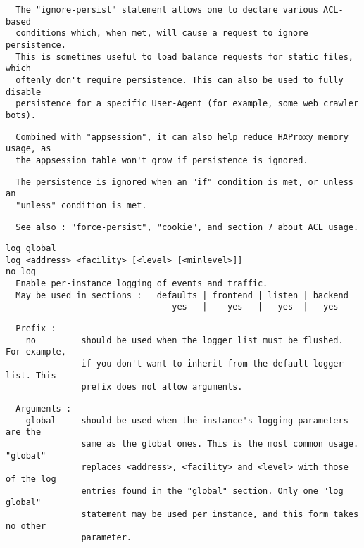 \begin{verbatim}
  The "ignore-persist" statement allows one to declare various ACL-based
  conditions which, when met, will cause a request to ignore persistence.
  This is sometimes useful to load balance requests for static files, which
  oftenly don't require persistence. This can also be used to fully disable
  persistence for a specific User-Agent (for example, some web crawler bots).
\end{verbatim}

\begin{verbatim}
  Combined with "appsession", it can also help reduce HAProxy memory usage, as
  the appsession table won't grow if persistence is ignored.
\end{verbatim}

\begin{verbatim}
  The persistence is ignored when an "if" condition is met, or unless an
  "unless" condition is met.
\end{verbatim}

\begin{verbatim}
  See also : "force-persist", "cookie", and section 7 about ACL usage.
\end{verbatim}

\begin{verbatim}
log global
log <address> <facility> [<level> [<minlevel>]]
no log
  Enable per-instance logging of events and traffic.
  May be used in sections :   defaults | frontend | listen | backend
                                 yes   |    yes   |   yes  |   yes
\end{verbatim}

\begin{verbatim}
  Prefix :
    no         should be used when the logger list must be flushed. For example,
               if you don't want to inherit from the default logger list. This
               prefix does not allow arguments.
\end{verbatim}

\begin{verbatim}
  Arguments :
    global     should be used when the instance's logging parameters are the
               same as the global ones. This is the most common usage. "global"
               replaces <address>, <facility> and <level> with those of the log
               entries found in the "global" section. Only one "log global"
               statement may be used per instance, and this form takes no other
               parameter.
\end{verbatim}

